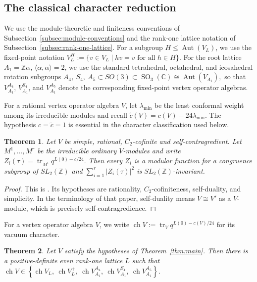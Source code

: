 \documentclass[12pt,leqno]{amsart}
\numberwithin{equation}{section} \newtheorem{thm}{Theorem}[section] \newtheorem{lem}[thm]{Lemma} \newtheorem{ex}[thm]{Example} \newtheorem{prop}[thm]{Proposition} \newtheorem{cor}[thm]{Corollary} \newtheorem{defi}[thm]{Definition} \newtheorem{rmk}[thm]{Remark} \newtheorem{notation}[thm]{Notation}
\newcommand{\Aut}{\operatorname{Aut}}
\newcommand{\ch}{\operatorname{ch}}
\newcommand{\SO}{\operatorname{SO}}
\def\Z{\mathbb{Z}} \def\N{\mathbb{N}} \def\A{\mathbb{A}} \def\C{\mathbb{C}} \def\R{\mathbb{R}} \def\Q{\mathbb{Q}} \def\F{\mathbb{F}}
\begin{document}
\subsection{The classical character reduction}

We use the module-theoretic and finiteness conventions of Subsection~\ref{subsec:module-conventions} and the rank-one lattice notation of Subsection~\ref{subsec:rank-one-lattice}. For a subgroup $H\leq\Aut(V_L)$, we use the fixed-point notation \(V_L^H:=\{v\in V_L\mid hv=v\text{ for all }h\in H\}.\) For the root lattice $A_1=\Z\alpha$, $\langle\alpha,\alpha\rangle=2$, we use the standard tetrahedral, octahedral, and icosahedral rotation subgroups \(A_4,\ S_4,\ A_5\subset SO(3)\subset\SO_3(\C)\cong\Aut(V_{A_1}),\) so that $V_{A_1}^{A_4}$, $V_{A_1}^{S_4}$, and $V_{A_1}^{A_5}$ denote the corresponding fixed-point vertex operator algebras.

For a rational vertex operator algebra $V$, let $\lambda_{\min}$ be the least conformal weight among its irreducible modules and recall \(\widetilde c(V)=c(V)-24\lambda_{\min}.\) The hypothesis $c=\widetilde c=1$ is essential in the character classification used below.

\begin{thm}\label{thm:DJ-modularity}
Let $V$ be simple, rational, $C_2$-cofinite and self-contragredient. Let $M^1,\dots,M^r$ be the irreducible ordinary $V$-modules and write \(Z_i(\tau)=\operatorname{tr}_{M^i}q^{L(0)-c/24}.\) Then every $Z_i$ is a modular function for a congruence subgroup of $SL_2(\Z)$ and \(\sum_{i=1}^r|Z_i(\tau)|^2\) is $SL_2(\Z)$-invariant.
\end{thm}

\begin{proof}
This is \cite[Theorem~2.6]{DJA4}. Its hypotheses are rationality, $C_2$-cofiniteness, self-duality, and simplicity. In the terminology of that paper, self-duality means $V\cong V'$ as a $V$-module, which is precisely self-contragredience.
\end{proof}

For a vertex operator algebra $V$, we write \(\ch V:=\operatorname{tr}_V q^{L(0)-c(V)/24}\) for its vacuum character.

\begin{thm}\label{thm:character-reduction}
Let $V$ satisfy the hypotheses of Theorem~\ref{thm:main}. Then there is a positive-definite even rank-one lattice $L$ such that \(\ch V\in \left\{ \ch V_L,\ \ch V_L^+,\ \ch V_{A_1}^{A_4},\ \ch V_{A_1}^{S_4},\ \ch V_{A_1}^{A_5} \right\}\).
\end{thm}
\end{document}
